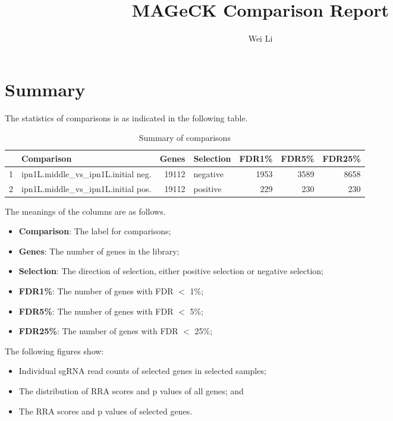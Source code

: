 \documentclass{article}
\begin{document}

\title{MAGeCK Comparison Report}
\author{Wei Li}

\maketitle


\tableofcontents

\section{Summary}


The statistics of comparisons is as indicated in the following table. 

\begin{table}[ht]
\centering
\begin{tabular}{rlrlrrr}
  \hline
 & Comparison & Genes & Selection & FDR1\% & FDR5\% & FDR25\% \\ 
  \hline
1 & ipn1L.middle\_vs\_ipn1L.initial neg. & 19112 & negative & 1953 & 3589 & 8658 \\ 
  2 & ipn1L.middle\_vs\_ipn1L.initial pos. & 19112 & positive & 229 & 230 & 230 \\ 
   \hline
\end{tabular}
\caption{Summary of comparisons} 
\label{tab:one}
\end{table}
The meanings of the columns are as follows.

\begin{itemize}
\item \textbf{Comparison}: The label for comparisons;
\item \textbf{Genes}: The number of genes in the library;
\item \textbf{Selection}: The direction of selection, either positive selection or negative selection;
\item \textbf{FDR1\%}: The number of genes with FDR $<$ 1\%;
\item \textbf{FDR5\%}: The number of genes with FDR $<$ 5\%;
\item \textbf{FDR25\%}: The number of genes with FDR $<$ 25\%;
\end{itemize}

The following figures show:

\begin{itemize}
\item Individual sgRNA read counts of selected genes in selected samples; 
\item The distribution of RRA scores and p values of all genes; and
\item The RRA scores and p values of selected genes.
\end{itemize}
\end{document}
